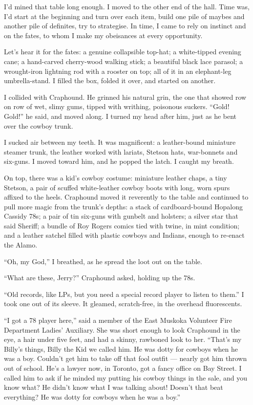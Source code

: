 I'd mined that table long enough. I moved to the other end of the
hall. Time was, I'd start at the beginning and turn over each item,
build one pile of maybes and another pile of definites, try to
strategise. In time, I came to rely on instinct and on the fates,
to whom I make my obeisances at every opportunity.

Let's hear it for the fates: a genuine collapsible top-hat; a
white-tipped evening cane; a hand-carved cherry-wood walking stick;
a beautiful black lace parasol; a wrought-iron lightning rod with a
rooster on top; all of it in an elephant-leg umbrella-stand. I
filled the box, folded it over, and started on another.

I collided with Craphound. He grinned his natural grin, the one
that showed row on row of wet, slimy gums, tipped with writhing,
poisonous suckers. ``Gold! Gold!'' he said, and moved along. I
turned my head after him, just as he bent over the cowboy trunk.

I sucked air between my teeth. It was magnificent: a leather-bound
miniature steamer trunk, the leather worked with lariats, Stetson
hats, war-bonnets and six-guns. I moved toward him, and he popped
the latch. I caught my breath.

On top, there was a kid's cowboy costume: miniature leather chaps,
a tiny Stetson, a pair of scuffed white-leather cowboy boots with
long, worn spurs affixed to the heels. Craphound moved it
reverently to the table and continued to pull more magic from the
trunk's depths: a stack of cardboard-bound Hopalong Cassidy 78s; a
pair of tin six-guns with gunbelt and holsters; a silver star that
said Sheriff; a bundle of Roy Rogers comics tied with twine, in
mint condition; and a leather satchel filled with plastic cowboys
and Indians, enough to re-enact the Alamo.

``Oh, my God,'' I breathed, as he spread the loot out on the
table.

``What are these, Jerry?'' Craphound asked, holding up the 78s.

``Old records, like LPs, but you need a special record player to listen 
to them.''
I took one out of its sleeve. It gleamed, scratch-free, in the
overhead fluorescents.

``I got a 78 player here,'' said a member of the East Muskoka
Volunteer Fire Department Ladies' Auxiliary. She was short enough
to look Craphound in the eye, a hair under five feet, and had a
skinny, rawboned look to her.
``That's my Billy's things, Billy the Kid we called him. He was dotty 
for cowboys when he was a boy. Couldn't get him to take off that fool 
outfit --- nearly got him thrown out of school. He's a lawyer now, in 
Toronto, got a fancy office on Bay Street. I called him to ask if he 
minded my putting his cowboy things in the sale, and you know what? 
He didn't know what I was talking about! Doesn't that beat everything? 
He was dotty for cowboys when he was a boy.''

